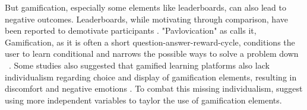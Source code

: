 But gamification, especially some elements like leaderboards, can also lead to negative outcomes. Leaderboards, while motivating through comparison, have been reported to demotivate participants \parencite{almeidaSystematicMappingNegative2021}.
"Pavlovication" as \textcite{klabbersArchitectureGameScience2018} calls it, Gamification, as it is often a short question-answer-reward-cycle, conditions the user to learn conditional and narrows the possible ways to solve a problem down ~\parencite{klabbersArchitectureGameScience2018}.
Some studies also suggested that gamified learning platforms also lack individualism regarding choice and display of gamification elements, resulting in discomfort and negative emotions \parencite{santosDoesGenderStereotype2023}.
To combat this missing individualism, \textcite{oliveiraTailoredGamificationEducation2023,dehghanzadehUsingGamificationSupport2024} suggest using more independent variables to taylor the use of gamification elements.
